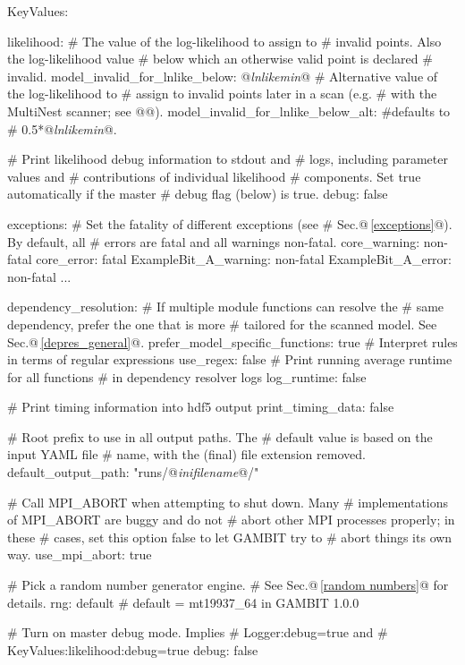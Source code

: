 \documentclass[pdftex,twocolumn,epjc3_preprint,runningheads]{svjour3}
\renewcommand{\_}{\discretionary{\underscore}{}{\underscore}}
\newcommand{\metavarf}[1]{\textit{\color{darkgreen}\footnotesize\textrm{#1}}}
\newcommand{\metavar}{\metavarf}
\newcommand\YAML{\textsf{YAML}\xspace}
\begin{document}
\begin{lstyaml}
KeyValues:

  likelihood:
    # The value of the log-likelihood to assign to
    # invalid points.  Also the log-likelihood value
    # below which an otherwise valid point is declared
    # invalid.
    model_invalid_for_lnlike_below: @\metavar{lnlike\_min}@
    # Alternative value of the log-likelihood to
    # assign to invalid points later in a scan (e.g.
    # with the MultiNest scanner; see @\cite{ScannerBit}@).
    model_invalid_for_lnlike_below_alt: #defaults to
    # 0.5*@\metavar{lnlike\_min}@.

    # Print likelihood debug information to stdout and
    # logs, including parameter values and
    # contributions of individual likelihood
    # components. Set true automatically if the master
    # debug flag (below) is true.
    debug: false

  exceptions:
    # Set the fatality of different exceptions (see
    # Sec.@\,\ref{exceptions}@).  By default, all
    # errors are fatal and all warnings non-fatal.
    core_warning: non-fatal
    core_error: fatal
    ExampleBit_A_warning: non-fatal
    ExampleBit_A_error: non-fatal
    ...

  dependency_resolution:
    # If multiple module functions can resolve the
    # same dependency, prefer the one that is more
    # tailored for the scanned model.  See Sec.@\,\ref{depres_general}@.
    prefer_model_specific_functions: true
    # Interpret rules in terms of regular expressions
    use_regex: false
    # Print running average runtime for all functions
    # in dependency resolver logs
    log_runtime: false

  # Print timing information into hdf5 output
  print_timing_data: false

  # Root prefix to use in all output paths. The
  # default value is based on the input \YAML file
  # name, with the (final) file extension removed.
  default_output_path: "runs/@\metavar{inifile\_name}@/"

  # Call MPI_ABORT when attempting to shut down. Many
  # implementations of MPI_ABORT are buggy and do not
  # abort other MPI processes properly; in these
  # cases, set this option false to let GAMBIT try to
  # abort things its own way.
  use_mpi_abort: true

  # Pick a random number generator engine.
  # See Sec.@\,\ref{random numbers}@ for details.
  rng: default # default = mt19937_64 in GAMBIT 1.0.0

  # Turn on master debug mode. Implies
  # Logger:debug=true and
  # KeyValues:likelihood:debug=true
  debug: false

\end{lstyaml}
\end{document}
